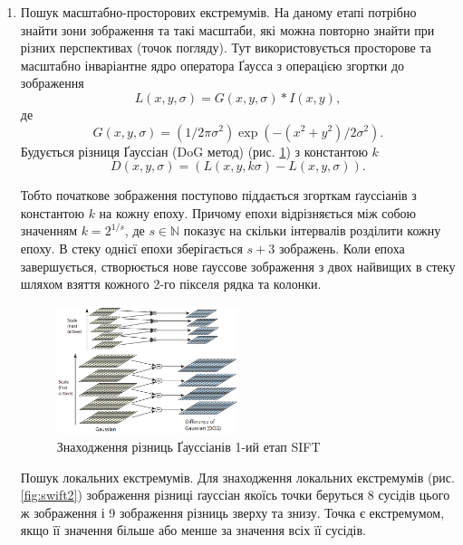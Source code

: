 \begin{enumerate}
    \item Пошук масштабно-просторових екстремумів.
          На даному етапі потрібно знайти зони зображення та такі масштаби, які можна повторно
          знайти при різних перспективах (точок погляду). Тут використовується просторове та
          масштабно інваріантне ядро оператора Ґаусса з операцією згортки
          до зображення
          \begin{equation*}
              L(x,y,\sigma) = G(x,y,\sigma) \ast I(x,y),
          \end{equation*}
          де
          \begin{equation*}
              G(x,y,\sigma) = (1/2\pi\sigma^2)\exp({-(x^2+y^2)/2\sigma^2}).
          \end{equation*}
          Будується різниця Ґауссіан (DoG метод) (рис. \ref{fig:swift1}) з константою $k$
          \begin{equation*}
              D(x,y,\sigma) = (L(x,y,k\sigma) - L(x,y,\sigma)).
          \end{equation*}

          Тобто початкове зображення поступово піддається згорткам ґауссіанів з константою
          $k$ на кожну епоху. Причому епохи відрізняється між собою значенням $k = 2^{1/s}$,
          де $s\in\mathbb{N}$ показує на скільки інтервалів розділити кожну епоху.
          В стеку однієї епохи зберігається $s+3$ зображень. Коли епоха завершується,
          створюється нове ґауссове зображення з двох найвищих в стеку
          шляхом взяття кожного 2-го пікселя рядка та колонки.

          \begin{figure}[H]
              \centering
              \includegraphics[width=0.5\textwidth]{images/sift1}
              \caption{Знаходження різниць Ґауссіанів 1-ий етап SIFT \cite{bib:sift}
                  \label{fig:swift1}
              }
          \end{figure}

          \subitem Пошук локальних екстремумів. Для знаходження локальних екстремумів
          (рис. \ref{fig:swift2}) зображення
          різниці ґауссіан якоїсь точки беруться 8 сусідів цього ж зображення і 9 зображення
          різниць зверху та знизу. Точка є екстремумом, якщо її значення більше або менше за
          значення всіх її сусідів.


\end{enumerate}
